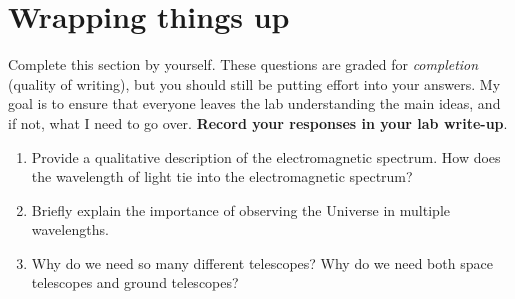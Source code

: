 \documentclass[11pt]{article}
\begin{document}
\section{Wrapping things up}

Complete this section by yourself. These questions are graded for \emph{completion} (quality of writing), but you should still be putting effort into your answers. My goal is to ensure that everyone leaves the lab understanding the main ideas, and if not, what I need to go over. \textbf{Record your responses in your lab write-up}. 
\begin{enumerate}
    
    \item Provide a qualitative description of the electromagnetic spectrum. How does the wavelength of light tie into the electromagnetic spectrum?
    
    \item Briefly explain the importance of observing the Universe in multiple wavelengths. 
    
    \item Why do we need so many different telescopes? Why do we need both space telescopes and ground telescopes?

\end{enumerate}
\end{document}
